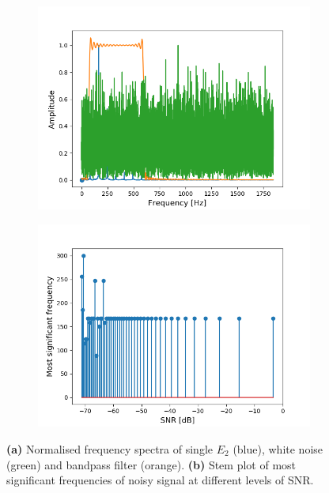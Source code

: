\begin{figure}[H]
\begin{subfigure}{0.49\textwidth}
\centering
\includegraphics[width=\textwidth]{figures/SNR/white_spectrum.png}
\caption{}
\label{fig:white_spectrum}
\end{subfigure}
\begin{subfigure}{0.49\textwidth}
\centering
\includegraphics[width=\textwidth]{figures/SNR/white_stem.png}
\caption{}
\label{fig:white_stem}
\end{subfigure}
\caption{\textbf{(a)} Normalised frequency spectra of single $E_2$ (blue), white noise (green) and bandpass filter (orange). \textbf{(b)} Stem plot of most significant frequencies of noisy signal at different levels of SNR.}
\label{fig:white_noise}
\end{figure}

